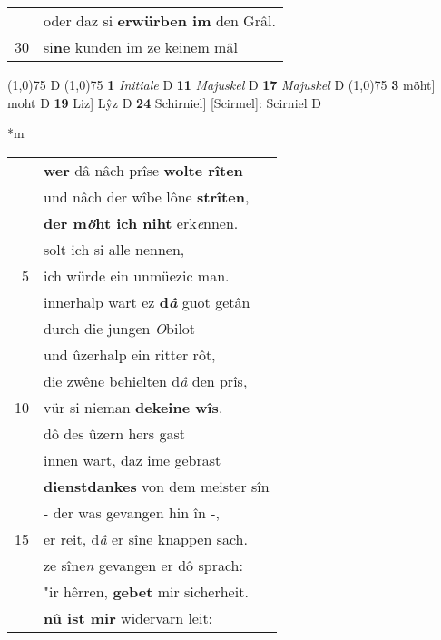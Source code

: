 \documentclass[8pt,a4paper,notitlepage]{article}
\begin{document}
\begin{table}[ht]
\begin{minipage}[t]{0.5\linewidth}
\begin{tabular}{rl}
 & oder daz si \textbf{erwürben im} den Grâl.\\ 
30 & si\textbf{ne} kunden im ze keinem mâl\\ 
\end{tabular}
\scriptsize
\line(1,0){75} \newline
D \newline
\line(1,0){75} \newline
\textbf{1} \textit{Initiale} D  \textbf{11} \textit{Majuskel} D  \textbf{17} \textit{Majuskel} D  \newline
\line(1,0){75} \newline
\textbf{3} möht] moht D \textbf{19} Liz] Lŷz D \textbf{24} Schirniel] [Scirmel]: Scirniel D \newline
\end{minipage}
\hspace{0.5cm}
\begin{minipage}[t]{0.5\linewidth}
\small
\begin{center}*m
\end{center}
\begin{tabular}{rl}
 & \textbf{wer} dâ nâch prîse \textbf{wolte rîten}\\ 
 & und nâch der wîbe lône \textbf{strîten},\\ 
 & \textbf{der m\textit{ö}ht ich niht} erk\textit{e}nnen.\\ 
 & solt ich si alle nennen,\\ 
5 & ich würde ein unmüezic man.\\ 
 & innerhalp wart ez \textbf{d\textit{â}} guot getân\\ 
 & durch die jungen \textit{O}bilot\\ 
 & und ûzerhalp ein ritter rôt,\\ 
 & die zwêne behielten d\textit{â} den prîs,\\ 
10 & vür si nieman \textbf{dekeine wîs}.\\ 
 & dô des ûzern hers gast\\ 
 & innen wart, daz ime gebrast\\ 
 & \textbf{dienstdankes} von dem meister sîn\\ 
 & - der was gevangen hin în -,\\ 
15 & er reit, d\textit{â} er sîne knappen sach.\\ 
 & ze sîne\textit{n} gevangen er dô sprach:\\ 
 & "ir hêrren, \textbf{gebet} mir sicherheit.\\ 
 & \textbf{nû ist mir} widervarn leit:\\ 

\end{tabular}
\end{minipage}
\end{table}
\end{document}
